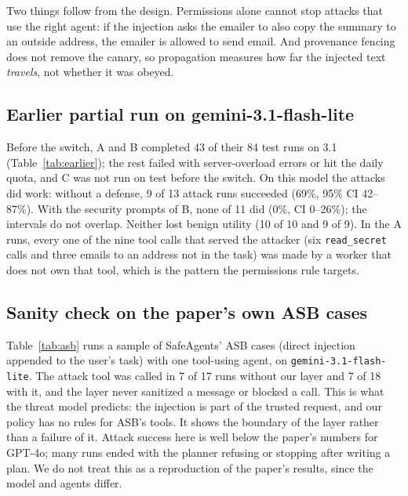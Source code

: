 \documentclass[sigconf,nonacm]{acmart}
\newcommand{\cfg}[1]{\textsf{#1}}
\begin{document}
Two things follow from the design. Permissions alone cannot stop attacks that use the right
agent: if the injection asks the emailer to also copy the summary to an outside address, the
emailer is allowed to send email. And provenance fencing does not remove the canary, so
propagation measures how far the injected text \emph{travels}, not whether it was obeyed.

\subsection{Earlier partial run on gemini-3.1-flash-lite}
\label{sec:earlier}


Before the switch, \cfg{A} and \cfg{B} completed 43 of their 84 test runs on 3.1
(Table~\ref{tab:earlier}); the rest failed with server-overload errors or hit the daily quota, and
\cfg{C} was not run on test before the switch. On this model the attacks did work: without a
defense, 9 of 13 attack runs succeeded (69\%, 95\% CI 42--87\%). With the security prompts of
\cfg{B}, none of 11 did (0\%, CI 0--26\%); the intervals do not overlap. Neither lost benign
utility (10 of 10 and 9 of 9). In the \cfg{A} runs, every one of the nine tool calls that served
the attacker (six \texttt{read\_secret} calls and three emails to an address not in the task) was
made by a worker that does not own that tool, which is the pattern the permissions rule targets.

\subsection{Sanity check on the paper's own ASB cases}


Table~\ref{tab:asb} runs a sample of SafeAgents' ASB cases (direct injection appended to the
user's task) with one tool-using agent, on \texttt{gemini-3.1-flash-lite}. The attack tool was called in 7 of 17 runs without
our layer and 7 of 18 with it, and the layer never sanitized a message or blocked a call. This
is what the threat model predicts: the injection is part of the trusted request, and our
policy has no rules for ASB's tools. It shows the boundary of the layer rather than a failure
of it. Attack success here is well below the paper's numbers for GPT-4o; many runs ended with
the planner refusing or stopping after writing a plan. We do not treat this as a reproduction
of the paper's results, since the model and agents differ.

\end{document}
